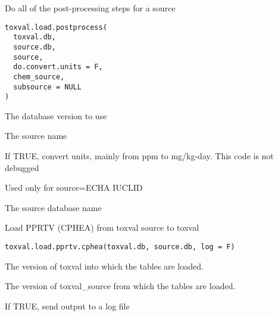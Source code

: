 \documentclass[letterpaper]{book}
\begin{document}
%
\begin{Description}\relax
Do all of the post-processing steps for a source
\end{Description}
%
\begin{Usage}
\begin{verbatim}
toxval.load.postprocess(
  toxval.db,
  source.db,
  source,
  do.convert.units = F,
  chem_source,
  subsource = NULL
)
\end{verbatim}
\end{Usage}
%
\begin{Arguments}
\begin{ldescription}
\item[\code{toxval.db}] The database version to use

\item[\code{source}] The source name

\item[\code{do.convert.units}] If TRUE, convert units, mainly from ppm to mg/kg-day. This code is not debugged

\item[\code{chem\_source}] Used only for source=ECHA IUCLID

\item[\code{sourcedb}] The source database name
\end{ldescription}
\end{Arguments}
%
\begin{Description}\relax
Load PPRTV (CPHEA) from toxval source to toxval
\end{Description}
%
\begin{Usage}
\begin{verbatim}
toxval.load.pprtv.cphea(toxval.db, source.db, log = F)
\end{verbatim}
\end{Usage}
%
\begin{Arguments}
\begin{ldescription}
\item[\code{toxval.db}] The version of toxval into which the tables are loaded.

\item[\code{source.db}] The version of toxval\_source from which the tables are loaded.

\item[\code{log}] If TRUE, send output to a log file
\end{ldescription}
\end{Arguments}
\end{document}
